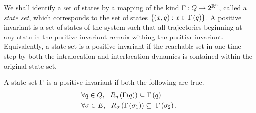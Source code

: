 We shall identify a set of states by a mapping of the kind
$\Gamma:Q\rightarrow 2^{\mathbb{R}^n}$, called a \emph{state
  set}, which corresponds to the set of states
$\left\{\left(x,q\right):x\in\Gamma\left(q\right)\right\}$.  A positive
invariant is a set of states of the system such that all trajectories
beginning at any state in the positive invariant remain withing the
positive invariant.  Equivalently, a state set is a positive invariant
if the reachable set in one time step by both the intralocation and
interlocation dynamics is contained within the original state set.
\begin{definition}
A state set $\Gamma$ is a positive invariant if
both the following are true.
\begin{align}
& \forall q\in Q,~~R_{q}\left(\Gamma(q)\right) \subseteq \Gamma\left(q\right)~\label{eqn:pi1}\\
& \forall\sigma\in E,~~R_{\sigma}\left(\Gamma\left(\sigma_{1}\right)\right) \subseteq~\label{eqn:pi2}
  \Gamma\left(\sigma_{2}\right).
\end{align}
\end{definition}
